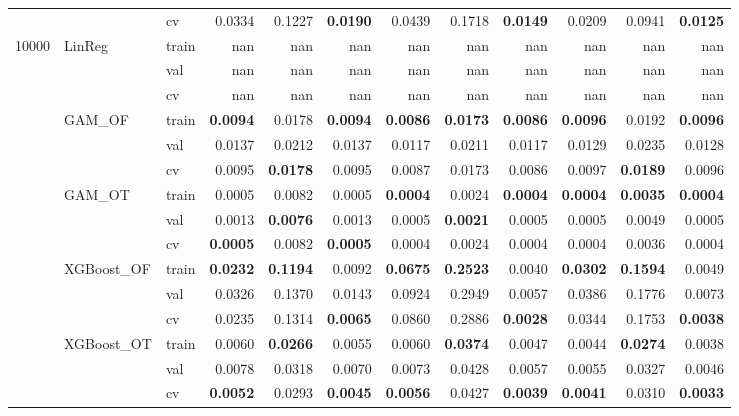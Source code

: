 \begin{tabular}{lllrrrrrrrrr}
 &  & cv & 0.0334 & 0.1227 & \bfseries 0.0190 & 0.0439 & 0.1718 & \bfseries 0.0149 & 0.0209 & 0.0941 & \bfseries 0.0125 \\
\multirow[c]{15}{*}{10000} & \multirow[c]{3}{*}{LinReg} & train & nan & nan & nan & nan & nan & nan & nan & nan & nan \\
 &  & val & nan & nan & nan & nan & nan & nan & nan & nan & nan \\
 &  & cv & nan & nan & nan & nan & nan & nan & nan & nan & nan \\
 & \multirow[c]{3}{*}{GAM_OF} & train & \bfseries 0.0094 & 0.0178 & \bfseries 0.0094 & \bfseries 0.0086 & \bfseries 0.0173 & \bfseries 0.0086 & \bfseries 0.0096 & 0.0192 & \bfseries 0.0096 \\
 &  & val & 0.0137 & 0.0212 & 0.0137 & 0.0117 & 0.0211 & 0.0117 & 0.0129 & 0.0235 & 0.0128 \\
 &  & cv & 0.0095 & \bfseries 0.0178 & 0.0095 & 0.0087 & 0.0173 & 0.0086 & 0.0097 & \bfseries 0.0189 & 0.0096 \\
 & \multirow[c]{3}{*}{GAM_OT} & train & 0.0005 & 0.0082 & 0.0005 & \bfseries 0.0004 & 0.0024 & \bfseries 0.0004 & \bfseries 0.0004 & \bfseries 0.0035 & \bfseries 0.0004 \\
 &  & val & 0.0013 & \bfseries 0.0076 & 0.0013 & 0.0005 & \bfseries 0.0021 & 0.0005 & 0.0005 & 0.0049 & 0.0005 \\
 &  & cv & \bfseries 0.0005 & 0.0082 & \bfseries 0.0005 & 0.0004 & 0.0024 & 0.0004 & 0.0004 & 0.0036 & 0.0004 \\
 & \multirow[c]{3}{*}{XGBoost_OF} & train & \bfseries 0.0232 & \bfseries 0.1194 & 0.0092 & \bfseries 0.0675 & \bfseries 0.2523 & 0.0040 & \bfseries 0.0302 & \bfseries 0.1594 & 0.0049 \\
 &  & val & 0.0326 & 0.1370 & 0.0143 & 0.0924 & 0.2949 & 0.0057 & 0.0386 & 0.1776 & 0.0073 \\
 &  & cv & 0.0235 & 0.1314 & \bfseries 0.0065 & 0.0860 & 0.2886 & \bfseries 0.0028 & 0.0344 & 0.1753 & \bfseries 0.0038 \\
 & \multirow[c]{3}{*}{XGBoost_OT} & train & 0.0060 & \bfseries 0.0266 & 0.0055 & 0.0060 & \bfseries 0.0374 & 0.0047 & 0.0044 & \bfseries 0.0274 & 0.0038 \\
 &  & val & 0.0078 & 0.0318 & 0.0070 & 0.0073 & 0.0428 & 0.0057 & 0.0055 & 0.0327 & 0.0046 \\
 &  & cv & \bfseries 0.0052 & 0.0293 & \bfseries 0.0045 & \bfseries 0.0056 & 0.0427 & \bfseries 0.0039 & \bfseries 0.0041 & 0.0310 & \bfseries 0.0033 \\
\end{tabular}
